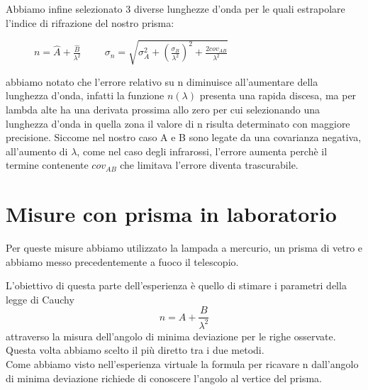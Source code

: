 \documentclass[a4paper]{article}
\theoremstyle{definition}
\begin{document}
\noindent Abbiamo infine selezionato 3 diverse lunghezze d'onda per le quali estrapolare l'indice di rifrazione del nostro prisma:
    

\begin{figure}[!htbp]
    	\captionsetup{labelformat=empty}
    	\caption{$n = \hat{A} + \frac{\hat{B}}{\lambda^{2}} \hspace{1cm} \sigma_{n} = \sqrt{ \sigma_{A}^{2} + ( \frac{\sigma_{B} }{\lambda^{2}})^{2} + \frac{2cov_{AB}}{\lambda^{2}}}$}
            
\end{figure}

abbiamo notato che l'errore relativo su n diminuisce all'aumentare della lunghezza d'onda, infatti la funzione \(n(\lambda)\) presenta una rapida discesa, ma per lambda alte ha una derivata prossima allo zero per cui selezionando una lunghezza d'onda in quella zona il valore di n risulta determinato con maggiore precisione. Siccome nel nostro caso A e B sono legate da una covarianza negativa, all'aumento di \(\lambda\), come nel caso degli infrarossi, l'errore aumenta perchè il termine contenente \(cov_{AB}\) che limitava l'errore diventa trascurabile. \\


\section{Misure con prisma in laboratorio}

Per queste misure abbiamo utilizzato la lampada a mercurio, un prisma di vetro e abbiamo messo precedentemente a fuoco il telescopio.

\noindent L'obiettivo di questa parte dell'esperienza è quello di stimare i parametri della legge di Cauchy \[n=A +\frac{B}{\lambda^{2}}\] attraverso la misura dell'angolo di minima deviazione per le righe osservate. Questa volta abbiamo scelto il più diretto tra i due metodi.\\
Come abbiamo visto nell'esperienza virtuale la formula per ricavare n dall'angolo di minima deviazione richiede di conoscere l'angolo al vertice del prisma.
 
\end{document}
